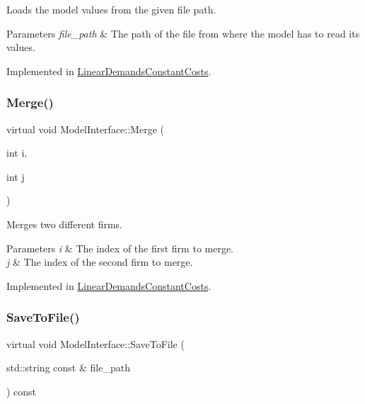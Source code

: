 Loads the model values from the given file path.


\begin{DoxyParams}{Parameters}
{\em file\+\_\+path} & The path of the file from where the model has to read its values. \\
\hline
\end{DoxyParams}


Implemented in \hyperlink{classLinearDemandsConstantCosts_a075add461e368629b9dfd8f72033e2ad}{Linear\+Demands\+Constant\+Costs}.

\mbox{\label{classModelInterface_a9aa52643da1fe9e74750e31a6c6ec469}} 
\subsubsection{\texorpdfstring{Merge()}{Merge()}}
{\footnotesize\ttfamily virtual void Model\+Interface\+::\+Merge (\begin{DoxyParamCaption}\item[{int}]{i,  }\item[{int}]{j }\end{DoxyParamCaption})\hspace{0.3cm}{\ttfamily [pure virtual]}}

Merges two different firms.


\begin{DoxyParams}{Parameters}
{\em i} & The index of the first firm to merge. \\
\hline
{\em j} & The index of the second firm to merge. \\
\hline
\end{DoxyParams}


Implemented in \hyperlink{classLinearDemandsConstantCosts_a0ee422d927b5a85f9aba8782b02f537b}{Linear\+Demands\+Constant\+Costs}.

\mbox{\label{classModelInterface_ab5709db8ecb96fd9efd02f4777d5502a}} 
\subsubsection{\texorpdfstring{Save\+To\+File()}{SaveToFile()}}
{\footnotesize\ttfamily virtual void Model\+Interface\+::\+Save\+To\+File (\begin{DoxyParamCaption}\item[{std\+::string const \&}]{file\+\_\+path }\end{DoxyParamCaption}) const\hspace{0.3cm}{\ttfamily [pure virtual]}}

